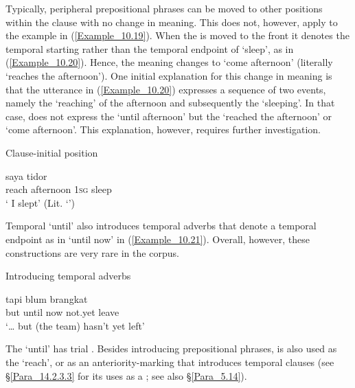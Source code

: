 Typically, peripheral prepositional phrases can be moved to other positions within the clause with no change in meaning. This does not, however, apply to the example in (\ref{Example_10.19}). When the  is moved to the front it denotes the temporal starting rather than the temporal endpoint of  ‘sleep’, as in (\ref{Example_10.20}). Hence, the meaning changes to ‘come afternoon’ (literally ‘reaches the afternoon’). One initial explanation for this change in meaning is that the utterance in (\ref{Example_10.20}) expresses a sequence of two events, namely the  ‘reaching’ of the afternoon and subsequently the  ‘sleeping’. In that case,  does not express the  ‘until afternoon’ but the  ‘reached the afternoon’ or ‘come afternoon’. This explanation, however, requires further investigation.


\begin{styleExampleTitle}
Clause-initial position
\end{styleExampleTitle}

\ea
\label{Example_10.20}
 {} {saya} {tidor}\\ %
 reach  afternoon  \textsc{1sg}  sleep\\
\glt 
‘ I slept’ (Lit. ‘’) \textstyleExampleSource{[Elicited BR120817.008]}
\z


Temporal  ‘until’ also introduces temporal adverbs that denote a temporal endpoint as in  ‘until now’ in (\ref{Example_10.21}). Overall, however, these constructions are very rare in the corpus.


\begin{styleExampleTitle}
Introducing temporal adverbs
\end{styleExampleTitle}

\ea
\label{Example_10.21}
\gll {\ldots} {tapi} {} {} {blum} {brangkat}\\ %
{}   but  until  now  not.yet  leave\\
\glt 
‘{\ldots} but  (the team) hasn’t yet left’ \textstyleExampleSource{[081023-002-Cv.0001]}
\z


The   ‘until’ has trial . Besides introducing prepositional phrases,  is also used as the   ‘reach’, or as an anteriority-marking  that introduces temporal clauses (see §\ref{Para_14.2.3.3} for its uses as a ; see also §\ref{Para_5.14}).



